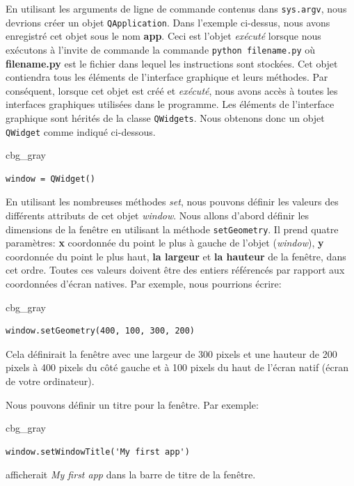 \documentclass[%
oneside,                 %
final,                   %
10pt,french]{article}
\newenvironment{_cod_tight}[1]{
   \def\FrameCommand{\colorbox{#1}}
   \FrameRule0.6pt\MakeFramed {\FrameRestore}\vskip3mm}
   {\vskip0mm\endMakeFramed}
\newenvironment{cod}[1]{
\bgroup\rmfamily
\fboxsep=0mm\relax
\begin{_cod_tight}{#1}
\list{}{\parsep=-2mm\parskip=0mm\topsep=0pt\leftmargin=2mm
\rightmargin=2\leftmargin\leftmargin=4pt\relax}
\item\relax}
{\endlist\end{_cod_tight}\egroup}
\begin{document}
En utilisant les arguments de ligne de commande contenus dans \texttt{sys.argv}, nous devrions créer un objet \texttt{QApplication}. Dans l'exemple ci-dessus, nous avons enregistré cet objet sous le nom \textbf{app}. Ceci est l'objet \emph{exécuté} lorsque nous exécutons à l'invite de commande la commande \texttt{python filename.py} où \textbf{filename.py} est le fichier dans lequel les instructions sont stockées. Cet objet contiendra tous les éléments de l'interface graphique et leurs méthodes. Par conséquent, lorsque cet objet est créé et \emph{exécuté}, nous avons accès à toutes les interfaces graphiques utilisées dans le programme. Les éléments de l'interface graphique sont hérités de la classe \texttt{QWidgets}. Nous obtenons donc un objet \texttt{QWidget} comme indiqué ci-dessous.
\begin{cod}{cbg_gray}\begin{verbatim}
window = QWidget()
\end{verbatim}
\end{cod}
\noindent
En utilisant les nombreuses méthodes \emph{set}, nous pouvons définir les valeurs des différents attributs de cet objet \emph{window}. Nous allons d’abord définir les dimensions de la fenêtre en utilisant la méthode \texttt{setGeometry}. Il prend quatre paramètres: \textbf{x} coordonnée du point le plus à gauche de l'objet (\emph{window}), \textbf{y} coordonnée du point le plus haut, \textbf{la largeur} et \textbf{la hauteur} de la fenêtre, dans cet ordre. Toutes ces valeurs doivent être des entiers référencés par rapport aux coordonnées d'écran natives. Par exemple, nous pourrions écrire:

\begin{cod}{cbg_gray}\begin{verbatim}
window.setGeometry(400, 100, 300, 200)
\end{verbatim}
\end{cod}
\noindent
Cela définirait la fenêtre avec une largeur de 300 pixels et une hauteur de 200 pixels à 400 pixels du côté gauche et à 100 pixels du haut de l'écran natif (écran de votre ordinateur).

Nous pouvons définir un titre pour la fenêtre. Par exemple:

\begin{cod}{cbg_gray}\begin{verbatim}
window.setWindowTitle('My first app')
\end{verbatim}
\end{cod}
\noindent
afficherait \emph{My first app} dans la barre de titre de la fenêtre.
\end{document}
